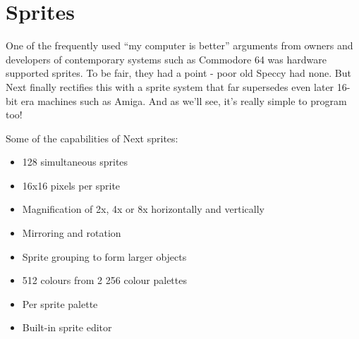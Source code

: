\section{Sprites}
\label{zx_next_sprites}


One of the frequently used ``my computer is better'' arguments from owners and developers of contemporary systems such as Commodore 64 was hardware supported sprites. To be fair, they had a point - poor old Speccy had none. But Next finally rectifies this with a sprite system that far supersedes even later 16-bit era machines such as Amiga. And as we'll see, it's really simple to program too!

Some of the capabilities of Next sprites:

\begin{itemize}[topsep=1pt,itemsep=1pt]
	\item 128 simultaneous sprites
	\item 16x16 pixels per sprite
	\item Magnification of 2x, 4x or 8x horizontally and vertically
	\item Mirroring and rotation
	\item Sprite grouping to form larger objects
	\item 512 colours from 2 256 colour palettes
	\item Per sprite palette
	\item Built-in sprite editor
\end{itemize}

